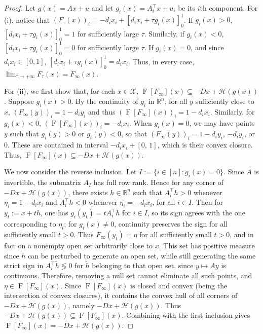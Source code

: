 \documentclass[letterpaper, conference]{ieeeconf}
\newcommand{\R}{\mathbb R}
\newcommand{\X}{\mathcal X}
\newcommand{\1}{\mathbf{1}}
\newcommand{\mc}{\mathcal}
\begin{document}
\begin{proof}
    Let \(g(x) = Ax + u\) and let \(g_i(x) = A_i^\top x + u_i\) be its \(i\)th component. 
    For (i), notice that \((F_\tau(x))_i = -d_ix_i + [d_ix_i + \tau g_i(x)]_0^1\).
    If \(g_i(x)>0\), \([d_ix_i + \tau g_i(x)]_0^1 = 1\) for sufficiently large \(\tau\).
    Similarly, if \(g_i(x)<0\), \([d_ix_i + \tau g_i(x)]_0^1 = 0\) for sufficiently large \(\tau\).
    If \(g_i(x) = 0\), and since \(d_ix_i \in [0,1]\), \([d_ix_i + \tau g_i(x)]_0^1 = d_ix_i\).
    Thus, in every case, \(\lim_{\tau\to+\infty} F_\tau(x) = F_\infty(x)\).

    For (ii), we first show that, for each \(x\in\X\), \(\operatorname{F}[F_\infty](x) \subseteq -Dx + \mc H(g(x))\).
    Suppose \(g_i(x) > 0\). 
    By the continuity of \(g_i\) in \(\R^n\), for all \(y\) sufficiently close to \(x\), \((F_\infty(y))_i = 1 - d_iy_i\) and thus \((\operatorname{F}[F_\infty](x))_i = 1 - d_ix_i\).
    Similarly, for \(g_i(x)< 0\), \((\operatorname{F}[F_\infty](x))_i = - d_ix_i\).
    When \(g_i(x) = 0\), we may have points \(y\) such that \(g_i(y)>0\) or \(g_i(y)<0\), so that \((F_\infty(y))_i = 1 - d_iy_i\), \(- d_iy_i\), or \(0\). 
    These are contained in interval \(-d_ix_i + [0,\,1]\), which is their convex closure. 
    Thus, \(\operatorname{F}[F_\infty](x) \subseteq -Dx + \mc H(g(x))\).
    
    We now consider the reverse inclusion.
    Let \(I:=\{i\in[n]:g_i(x)=0\}\). 
    Since \(A\) is invertible, the submatrix \(A_I\) has full row rank.
    Hence for any corner of \(-Dx+\mc H(g(x))\), there exists \(h\in\R^n\) such that \(A_i^\top h>0\) whenever \(\eta_i=1-d_i x_i\) and \(A_i^\top h<0\) whenever \(\eta_i=-d_i x_i\), for all \(i\in I\). 
    Then for \(y_t:=x+th\), one has \(g_i(y_t)=tA_i^\top h\) for \(i\in I\), so its sign agrees with the one corresponding to \(\eta_i\); for \(g_i(x)\neq0\), continuity preserves the sign for all sufficiently small \(t>0\). 
    Thus \(F_\infty(y_t)=\eta\) for all sufficiently small \(t>0\), and in fact on a nonempty open set arbitrarily close to \(x\). 
    This set has positive measure since \(h\) can be perturbed to generate an open set, while still generating the same strict sign in \(A_i^\top \tilde h \lessgtr 0\) for  \(\tilde h\) belonging to that open set, since \(y\mapsto Ay\) is continuous.
    Therefore, removing a null set cannot eliminate all such points, and \(\eta\in \operatorname{F}[F_\infty](x)\). 
    Since \(\operatorname{F}[F_\infty](x)\) is closed and convex (being the intersection of convex closures), it contains the convex hull of all corners of \(-Dx+\mc H(g(x))\), namely \(-Dx+\mc H(g(x))\). 
    Thus \(-Dx+\mc H(g(x))\subseteq \operatorname{F}[F_\infty](x)\).
    Combining with the first inclusion gives \(\operatorname{F}[F_\infty](x)= -Dx+\mc H(g(x))\).
\end{proof}
\end{document}
